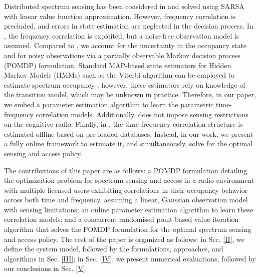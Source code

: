 \documentclass[10pt,twocolumn]{IEEEtran}
\begin{document}
Distributed spectrum sensing has been considered in \cite{6507570} and solved using SARSA with linear value function approximation. However, frequency correlation is precluded, and errors in state estimation are neglected in the decision process. In \cite{6956794}, the frequency correlation is exploited, but a noise-free observation model is assumed. Compared to \cite{6507570, 6956794}, we account for the uncertainty in the occupancy state and for noisy observations via a partially observable Markov decision process (POMDP) formulation. Standard MAP-based state estimators for Hidden Markov Models (HMMs) such as the Viterbi algorithm can be employed to estimate spectrum occupancy \cite{4554696}; however, these estimators rely on knowledge of the transition model, which may be unknown in practice. Therefore, in our paper, we embed a parameter estimation algorithm to learn the parametric time-frequency correlation models. Additionally, \cite{4554696} does not impose sensing restrictions on the cognitive radio. Finally, in \cite{6956794, 4554696}, the time-frequency correlation structure is estimated offline based on pre-loaded databases. Instead, in our work, we present a fully online framework to estimate it, and simultaneously, solve for the optimal sensing and access policy.

The contributions of this paper are as follows: a POMDP formulation detailing the optimization problem for spectrum sensing and access in a radio environment with multiple licensed users exhibiting correlations in their occupancy behavior across both time and frequency, assuming a linear, Gaussian observation model with sensing limitations; an online parameter estimation algorithm to learn these correlation models; and a concurrent randomised point-based value iteration algorithm that solves the POMDP formulation for the optimal spectrum sensing and access policy. The rest of the paper is organized as follows: in Sec. \ref{II}, we define the system model, followed by the formulations, approaches, and algorithms in Sec. \ref{III}; in Sec. \ref{IV}, we present numerical evaluations, followed by our conclusions in Sec. \ref{V}.
\vspace{-4mm}
\end{document}
